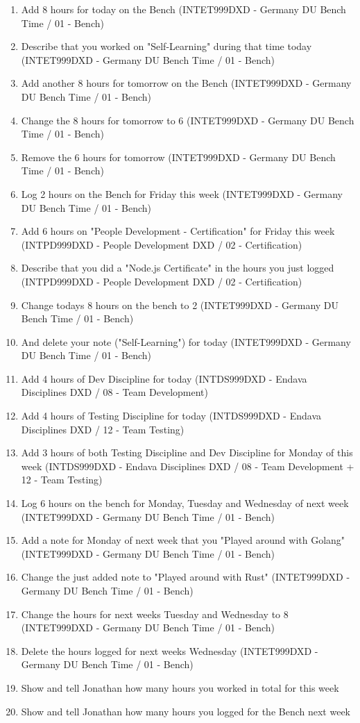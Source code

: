 \documentclass[oneside,bibliography=totocnumbered,BCOR=5mm]{scrbook}
\begin{document}
\begin{enumerate}
  \item Add 8 hours for today on the Bench (INTET999DXD - Germany DU Bench Time / 01 - Bench)
  \item Describe that you worked on "Self-Learning" during that time today (INTET999DXD - Germany DU Bench Time / 01 - Bench)
  \item Add another 8 hours for tomorrow on the Bench (INTET999DXD - Germany DU Bench Time / 01 - Bench)
  \item Change the 8 hours for tomorrow to 6 (INTET999DXD - Germany DU Bench Time / 01 - Bench)
  \item Remove the 6 hours for tomorrow (INTET999DXD - Germany DU Bench Time / 01 - Bench)
  \item Log 2 hours on the Bench for Friday this week (INTET999DXD - Germany DU Bench Time / 01 - Bench)
  \item Add 6 hours on "People Development - Certification" for Friday this week (INTPD999DXD - People Development DXD / 02 - Certification)
  \item Describe that you did a "Node.js Certificate" in the hours you just logged (INTPD999DXD - People Development DXD / 02 - Certification)
  \item Change todays 8 hours on the bench to 2 (INTET999DXD - Germany DU Bench Time / 01 - Bench)
  \item And delete your note ("Self-Learning") for today (INTET999DXD - Germany DU Bench Time / 01 - Bench)
  \item Add 4 hours of Dev Discipline for today (INTDS999DXD - Endava Disciplines DXD / 08 - Team Development)
  \item Add 4 hours of Testing Discipline for today (INTDS999DXD - Endava Disciplines DXD / 12 - Team Testing)
  \item Add 3 hours of both Testing Discipline and Dev Discipline for Monday of this week (INTDS999DXD - Endava Disciplines DXD / 08 - Team Development + 12 - Team Testing)
  \item Log 6 hours on the bench for Monday, Tuesday and Wednesday of next week (INTET999DXD - Germany DU Bench Time / 01 - Bench)
  \item Add a note for Monday of next week that you "Played around with Golang" (INTET999DXD - Germany DU Bench Time / 01 - Bench)
  \item Change the just added note to "Played around with Rust" (INTET999DXD - Germany DU Bench Time / 01 - Bench)
  \item Change the hours for next weeks Tuesday and Wednesday to 8 (INTET999DXD - Germany DU Bench Time / 01 - Bench)
  \item Delete the hours logged for next weeks Wednesday (INTET999DXD - Germany DU Bench Time / 01 - Bench)
  \item Show and tell Jonathan how many hours you worked in total for this week
  \item Show and tell Jonathan how many hours you logged for the Bench next week
\end{enumerate}
\end{document}
